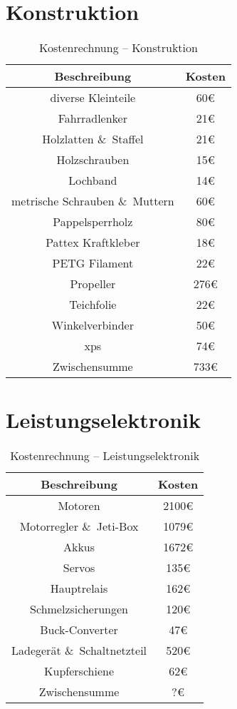 \section{Konstruktion}
\begin{table}[H]
    \centering
    \begin{tabular}{|c|c|}
        \hline
        \textbf{Beschreibung} & \textbf{Kosten}\\\hline
        diverse Kleinteile & 60\euro\\
        Fahrradlenker & 21\euro\\
        Holzlatten \&\ Staffel & 21\euro\\
        Holzschrauben & 15\euro\\
        Lochband & 14\euro\\
        metrische Schrauben \&\ Muttern & 60\euro\\
        Pappelsperrholz & 80\euro\\
        Pattex Kraftkleber & 18\euro\\
        PETG Filament & 22\euro\\
        Propeller & 276\euro\\
        Teichfolie & 22\euro\\
        Winkelverbinder & 50\euro\\
        \acs{xps} & 74\euro\\        
        \hline
        Zwischensumme & 733\euro\\\hline
    \end{tabular}
    \caption{Kostenrechnung -- Konstruktion}
\end{table}

\section{Leistungselektronik}
\begin{table}[H]
    \centering
    \begin{tabular}{|c|c|}
        \hline
        \textbf{Beschreibung} & \textbf{Kosten}\\\hline
        Motoren & 2100\euro\\
        Motorregler \&\ Jeti-Box & 1079\euro\\
        Akkus & 1672\euro\\
        Servos & 135\euro\\
        Hauptrelais & 162\euro\\
        Schmelzsicherungen & 120\euro\\
        Buck-Converter & 47\euro\\
        Ladegerät \&\ Schaltnetzteil & 520\euro\\
        Kupferschiene & 62\euro\\
        \hline
        Zwischensumme & ?\euro\\\hline
    \end{tabular}
    \caption{Kostenrechnung -- Leistungselektronik}
\end{table}

